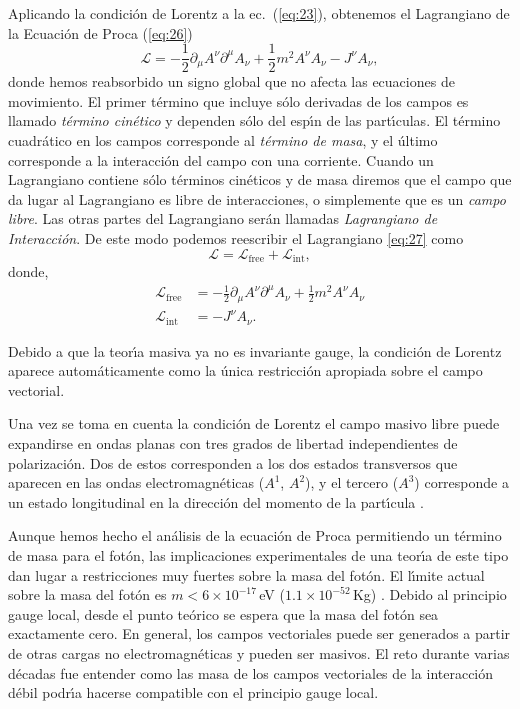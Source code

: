 \begin{frame}
Aplicando la condici\'on de Lorentz a la ec.~(\ref{eq:23}), obtenemos el
Lagrangiano de la Ecuaci\'on de Proca (\ref{eq:26})
\begin{equation}
  \label{eq:27}
  \mathcal{L}=-\frac{1}{2}\partial_\mu A^\nu\partial^\mu A_\nu+\frac{1}{2} m^2A^\nu A_\nu-J^\nu A_\nu,
\end{equation}
donde hemos reabsorbido un signo global que no afecta las ecuaciones
de movimiento. El primer t\'ermino que incluye s\'olo derivadas de los
campos es llamado \emph{t\'ermino cin\'etico} y dependen s\'olo del esp\'\i n de
las part\'\i culas. El t\'ermino cuadr\'atico en
los campos corresponde al \emph{t\'ermino de masa}, y el \'ultimo
corresponde a la interacci\'on del campo con una corriente. Cuando un
Lagrangiano contiene s\'olo t\'erminos cin\'eticos y de masa diremos que el
campo que da lugar al Lagrangiano es libre de interacciones, o
simplemente que es un \emph{campo libre}. Las otras partes del
Lagrangiano ser\'an llamadas \emph{Lagrangiano de Interacci\'on}. De este
modo podemos reescribir el Lagrangiano \eqref{eq:27} como
\begin{equation*}
\mathcal{L}=\mathcal{L}_{\text{free}}+\mathcal{L}_{\text{int}},  
\end{equation*}
donde,
\begin{align}
\mathcal{L}_{\text{free}}&=-\frac{1}{2}\partial_\mu A^\nu\partial^\mu A_\nu+\frac{1}{2} m^2A^\nu A_\nu\nonumber\\
\label{eq:28}
\mathcal{L}_{\text{int}}&=-J^\nu A_\nu.
\end{align}

Debido a que la teor\'\i a masiva ya no es invariante gauge, la condici\'on
de Lorentz aparece autom\'aticamente como la \'unica restricci\'on apropiada
sobre el campo vectorial.

Una vez se toma en cuenta la condici\'on de Lorentz el campo masivo
libre puede expandirse en ondas planas con tres grados de libertad
independientes de polarizaci\'on. Dos de estos corresponden a los dos
estados transversos que aparecen en las ondas electromagn\'eticas
($A^1$, $A^2$), y el tercero ($A^3$) corresponde a un estado
longitudinal en la direcci\'on del momento de la part\'\i cula \cite{Gross}.

Aunque hemos hecho el an\'alisis de la ecuaci\'on de Proca permitiendo un
t\'ermino de masa para el fot\'on, las implicaciones experimentales de una
teor\'\i a de este tipo dan lugar a restricciones muy fuertes sobre la
masa del fot\'on\cite{Goldhaber:1971mr}. El l\'\i mite actual sobre la masa
del fot\'on es $m\lt 6\times10^{-17}\,$eV ($1.1\times10^{-52}\,$Kg)
\cite{Yao:2006px}. Debido al principio gauge local, desde el punto
te\'orico se espera que la masa del fot\'on sea exactamente cero. En
general, los campos vectoriales puede ser generados a partir de otras
cargas no electromagn\'eticas y pueden ser masivos. El reto durante
varias d\'ecadas fue entender como las masa de los campos vectoriales de
la interacci\'on d\'ebil podr\'\i a hacerse compatible con el principio gauge
local.  


\end{frame}
